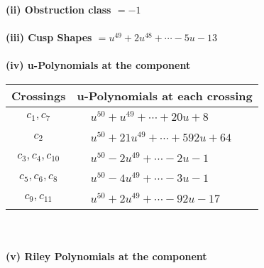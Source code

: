 \documentclass[1p]{elsarticle_modified}
\theoremstyle{definition}
\begin{document}
\flushleft \textbf{(ii) Obstruction class $= -1$}\\~\\
\flushleft \textbf{(iii) Cusp Shapes $= u^{49}+2 u^{48}+\cdots-5 u-13$}\\~\\
\newpage\renewcommand{\arraystretch}{1}
\flushleft \textbf{(iv) u-Polynomials at the component}\newline \\
\begin{tabular}{m{50pt}|m{274pt}}
Crossings & \hspace{64pt}u-Polynomials at each crossing \\
\hline $$\begin{aligned}c_{1},c_{7}\end{aligned}$$&$\begin{aligned}
&u^{50}+u^{49}+\cdots+20 u+8
\end{aligned}$\\
\hline $$\begin{aligned}c_{2}\end{aligned}$$&$\begin{aligned}
&u^{50}+21 u^{49}+\cdots+592 u+64
\end{aligned}$\\
\hline $$\begin{aligned}c_{3},c_{4},c_{10}\end{aligned}$$&$\begin{aligned}
&u^{50}-2 u^{49}+\cdots-2 u-1
\end{aligned}$\\
\hline $$\begin{aligned}c_{5},c_{6},c_{8}\end{aligned}$$&$\begin{aligned}
&u^{50}-4 u^{49}+\cdots-3 u-1
\end{aligned}$\\
\hline $$\begin{aligned}c_{9},c_{11}\end{aligned}$$&$\begin{aligned}
&u^{50}+2 u^{49}+\cdots-92 u-17
\end{aligned}$\\
\hline
\end{tabular}\\~\\
\newpage\renewcommand{\arraystretch}{1}
\flushleft \textbf{(v) Riley Polynomials at the component}\newline \\
\end{document}
